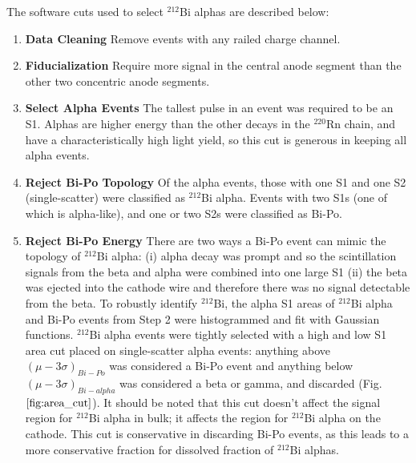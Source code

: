 The software cuts used to select $^{212}$Bi alphas are described below: 
\begin{enumerate}
\item \textbf{Data Cleaning} Remove events with any railed charge channel.
\item \textbf{Fiducialization} Require more signal in the central anode segment than the other two concentric anode segments.
\item \textbf{Select Alpha Events} The tallest pulse in an event was required to be an S1. Alphas are higher energy than the other decays in the $^{220}$Rn chain, and have a characteristically high light yield, so this cut is generous in keeping all alpha events.
\item \textbf{Reject Bi-Po Topology} Of the alpha events, those with one S1 and one S2 (single-scatter) were classified as $^{212}$Bi alpha. Events with two S1s (one of which is alpha-like), and one or two S2s were classified as Bi-Po.
\item \textbf{Reject Bi-Po Energy} There are two ways a Bi-Po event can mimic the topology of $^{212}$Bi alpha: (i) alpha decay was prompt and so the scintillation signals from the beta and alpha were combined into one large S1 (ii) the beta was ejected into the cathode wire and therefore there was no signal detectable from the beta. To robustly identify $^{212}$Bi, the alpha S1 areas of $^{212}$Bi alpha and Bi-Po events from Step 2 were histogrammed and fit with Gaussian functions. $^{212}$Bi alpha events were tightly selected with a high and low S1 area cut placed on single-scatter alpha events: anything above $(\mu - 3\sigma)_{Bi-Po}$ was considered a Bi-Po event and anything below $(\mu - 3\sigma)_{Bi-alpha}$ was considered a beta or gamma, and discarded (Fig. $\ref{fig:area_cut}$). It should be noted that this cut doesn't affect the signal region for $^{212}$Bi alpha in bulk; it affects the region for $^{212}$Bi alpha on the cathode. This cut is conservative in discarding Bi-Po events, as this leads to a more conservative fraction for dissolved fraction of $^{212}$Bi alphas.

\end{enumerate}
